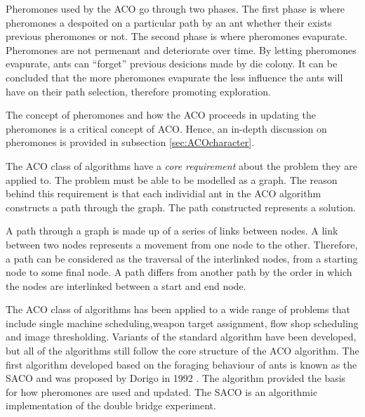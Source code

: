 Pheromones used by the \gls{ACO} go through two phases. The first phase is where pheromones a despoited on a particular path by an ant whether their exists previous pheromones or not. The second phase is where pheromones evapurate. Pheromones are not permenant and deteriorate over time\cite{FundamentalSwarm}. By letting pheromones evapurate, ants can ``forget'' previous desicions made by die colony\cite{FundamentalSwarm}. It can be concluded that the more pheromones evapurate the less influence the ants will have on their path selection, therefore promoting exploration\cite{FundamentalSwarm}.

The concept of pheromones and how the \gls{ACO} proceeds in updating the pheromones is a critical concept of \gls{ACO}. Hence, an in-depth discussion on pheromones is provided in subsection \ref{sec:ACOcharacter}.

The \gls{ACO} class of algorithms have a \emph{core requirement} about the problem they are applied to\cite{FundamentalSwarm}. The problem must be able to be modelled as a graph. The reason behind this requirement is that each individial ant in the \gls{ACO} algorithm constructs a path through the graph\cite{FundamentalSwarm}. The path constructed represents a solution.

A path through a graph is made up of a series of links between nodes\cite{AIModernApproach,DataStructuresJava}. A link between two nodes represents a movement from one node to the other\cite{AIModernApproach,DataStructuresJava}. Therefore, a path can be considered as the traversal of the interlinked nodes, from a starting node to some final node\cite{AIModernApproach,DataStructuresJava}. A path differs from another path by the order in which the nodes are interlinked between a start and end node\cite{AIModernApproach,DataStructuresJava}.

 The \gls{ACO} class of algorithms has been applied to a wide range of problems that include single machine scheduling\cite{ACOSingleMachine},weapon target assignment\cite{WeaponTargetACO}, flow shop scheduling\cite{ACOFlowShop} and image thresholding\cite{ACOImageThreshold}. Variants of the standard algorithm have been developed, but all of the algorithms still follow the core structure of the \gls{ACO} algorithm\cite{CompuIntelligenceIntro,FundamentalSwarm}.
The first algorithm developed based on the foraging behaviour of ants is known as the \gls{SACO} and was proposed by Dorigo in 1992 \cite{CompuIntelligenceIntro}. The algorithm provided the basis for how pheromones are used and updated. The \gls{SACO} is an algorithmic implementation of the double bridge experiment.

